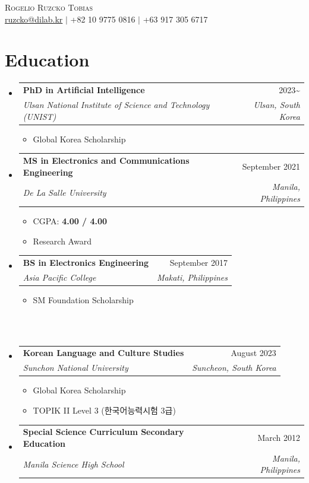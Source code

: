 \documentclass[a4paper,11pt]{article}
\makeatletter
\newcommand{\resumeItem}[1]{
  \item\small{
    {#1 \vspace{-2pt}}
  }
}
\newcommand{\resumeSubheading}[4]{
  \vspace{-2pt}\item
    \begin{tabular*}{0.97\textwidth}[t]{l@{\extracolsep{\fill}}r}
      \textbf{#1} & #2 \\
      \textit{\small#3} & \textit{\small #4} \\
    \end{tabular*}\vspace{-7pt}
}
\newcommand{\resumeSubHeadingListStart}{\begin{itemize}[leftmargin=0.15in, label={}]}
\newcommand{\resumeSubHeadingListEnd}{\end{itemize}}
\newcommand{\resumeItemListStart}{\begin{itemize}}
\newcommand{\resumeItemListEnd}{\end{itemize}\vspace{-5pt}}
\makeatother
\begin{document}

\begin{center}
    {\huge \scshape Rogelio Ruzcko Tobias} \\ \vspace{3pt}
    \small \href{mailto:ruzcko@dilab.kr}{{ruzcko@dilab.kr}} $|$ +82 10 9775 0816 $|$ +63 917 305 6717
\end{center}


\section{Education}
  \resumeSubHeadingListStart
    \resumeSubheading
      {PhD in Artificial Intelligence}{2023\textasciitilde{}}
      {Ulsan National Institute of Science and Technology (UNIST)}{Ulsan, South Korea}
      \resumeItemListStart
        \resumeItem{Global Korea Scholarship}
      \resumeItemListEnd
    \resumeSubheading
      {MS in Electronics and Communications Engineering}{September 2021}
      {De La Salle University}{Manila, Philippines}
      \resumeItemListStart
        \resumeItem{CGPA: \textbf{4.00 / 4.00}}
        \resumeItem{Research Award}
      \resumeItemListEnd
    \resumeSubheading
      {BS in Electronics Engineering}{September 2017}
      {Asia Pacific College}{Makati, Philippines}
      \resumeItemListStart
        \resumeItem{SM Foundation Scholarship}
        \\\
      \resumeItemListEnd
    \resumeSubheading
      {Korean Language and Culture Studies}{August 2023}
      {Sunchon National University}{Suncheon, South Korea}
      \resumeItemListStart
        \resumeItem{Global Korea Scholarship}
        \resumeItem{TOPIK II Level 3 (한국어능력시험 3급)}
      \resumeItemListEnd
    \resumeSubheading
      {Special Science Curriculum Secondary Education}{March 2012}
      {Manila Science High School}{Manila, Philippines}
      \newline
  \resumeSubHeadingListEnd
\end{document}

